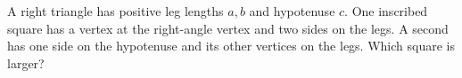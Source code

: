 A right triangle has positive leg lengths $a,b$ and hypotenuse $c$. One inscribed square has a vertex at the right-angle vertex and two sides on the legs. A second has one side on the hypotenuse and its other vertices on the legs. Which square is larger?
